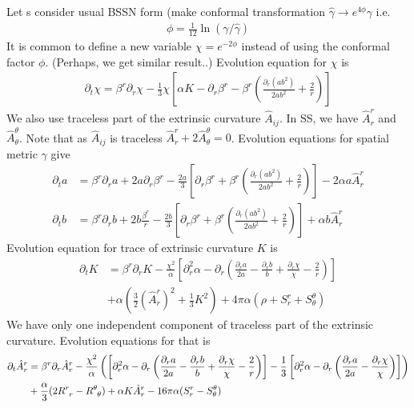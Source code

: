 \documentclass[prd]{revtex4}
\newcommand*\apost{\textsc{\char13}}
\begin{document}
Let \apost s consider usual BSSN form (make conformal transformation $\hat{\gamma} \rightarrow e^{4\phi} \gamma$ i.e.
\begin{align}
\phi = \frac{1}{12} \ln(\gamma / \hat{\gamma})
\end{align}
It is common to define a new variable $\chi = e^{-2 \phi}$ instead of using the conformal factor $\phi$. (Perhaps, we get similar result..) Evolution equation for $\chi$ is
\begin{align}
\partial_t \chi = \beta^r \partial_r \chi - \frac{1}{3} \chi \left[ \alpha K - \partial_r \beta^r - \beta^r \left(\frac{\partial_r (a b^2)}{2 a b^2} + \frac{2}{r}\right) \right]
\end{align}
We also use traceless part of the extrinsic curvature $\hat{A}_{ij}$. In SS, we have $\hat{A}^r_r$ and $\hat{A}^\theta_\theta$. Note that as $\hat{A}_{ij}$ is traceless $\hat{A}^r_r+2\hat{A}^\theta_\theta=0$. Evolution equations for spatial metric $\gamma$ give
\begin{align}
\partial_t a &= \beta^r \partial_r a + 2 a \partial_r \beta^r - \frac{2a}{3}\left[ \partial_r \beta^r +\beta^r \left(\frac{\partial_r (a b^2)}{2 a b^2} + \frac{2}{r}\right)\right] -2 \alpha a \hat{A}^r_r \\
\partial_t b &= \beta^r \partial_r b + 2 b \frac{\beta^r}{r} - \frac{2b}{3} \left[\partial_r \beta^r + \beta^r \left(\frac{\partial_r (a b^2)}{2 a b^2} + \frac{2}{r}\right)\right] + \alpha b \hat{A}^r_r
\end{align}
Evolution equation for trace of extrinsic curvature $K$ is
\begin{align}
\partial_t K &= \beta^r \partial_r K - \frac{\chi^2}{\alpha} \left[\partial_r^2 \alpha - \partial_r \left(\frac{\partial_r a}{2a} - \frac{\partial_r b}{b} +\frac{\partial_r \chi}{\chi} - \frac{2}{r} \right) \right] \nonumber \\
&+ \alpha \left(\frac{3}{2} (\hat{A}^r_r)^2 + \frac{1}{3} K^2 \right) + 4 \pi \alpha (\rho + S^r_r + S^\theta_\theta)
\end{align}
We have only one independent component of traceless part of the extrinsic curvature. Evolution equations for that is
\begin{align}
\partial_t \hat{A}^r_r &= \beta^r \partial_r \hat{A}^r_r - \frac{\chi^2}{\alpha}\left( \left[\partial_r^2 \alpha - \partial_r \left(\frac{\partial_r a}{2a} - \frac{\partial_r b}{b} +\frac{\partial_r \chi}{\chi} - \frac{2}{r} \right) \right] -\frac{1}{3} \left[\partial_r^2 \alpha - \partial_r \left(\frac{\partial_r a}{2a} - \frac{\partial_r \chi}{\chi} \right) \right] \right)\nonumber \\
&+\frac{\alpha}{3}(2 R\indices{^r_r} - R\indices{^\theta_\theta}) + \alpha K \hat{A}^r_r - 16\pi \alpha ( S^r_r - S^\theta_\theta)
\end{align}
\end{document}
